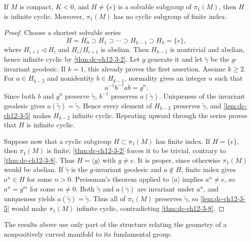 \begin{theorem}
  \label{thm:dc-ch12-3-10}
  If $M$ is compact, $K<0$, and $H\neq\{e\}$ is a solvable subgroup of
  $\pi_1(M)$, then $H$ is infinite cyclic. Moreover, $\pi_1(M)$ has no cyclic
  subgroup of finite index.
\end{theorem}
\begin{proof}
  \sketch
  Choose a shortest solvable series
  \[
    H=H_0\supset H_1\supset\cdots\supset H_{k-1}\supset H_k=\{e\},
  \]
  where $H_{i+1}\triangleleft H_i$ and $H_i/H_{i+1}$ is abelian. Then
  $H_{k-1}$ is nontrivial and abelian, hence infinite cyclic by
  \cref{thm:dc-ch12-3-2}. Let $g$ generate it and let $\tilde\gamma$ be the
  $g$-invariant geodesic. If $k=1$, this already proves the first assertion.
  Assume $k\geq2$. For $a\in H_{k-2}$ and nonidentity
  $b\in H_{k-1}$, normality gives an integer $n$ such that
  \[
    a^{-1}b^{-1}ab=g^n.
  \]
  Since both $b$ and $g^n$ preserve $\tilde\gamma$, $b^{-1}$ preserves
  $a(\tilde\gamma)$. Uniqueness of the invariant geodesic gives
  $a(\tilde\gamma)=\tilde\gamma$. Hence every element of $H_{k-2}$ preserves
  $\tilde\gamma$, and \cref{lem:dc-ch12-3-5} makes $H_{k-2}$ infinite
  cyclic. Repeating upward through the series proves that $H$ is infinite
  cyclic.

  Suppose now that a cyclic subgroup $H\subset\pi_1(M)$ has finite index. If
  $H=\{e\}$, then $\pi_1(M)$ is finite; \cref{thm:dc-ch12-3-2} forces it to
  be trivial, contrary to \cref{thm:dc-ch12-3-8}. Thus
  $H=\langle g\rangle$ with $g\neq e$. It is proper, since otherwise
  $\pi_1(M)$ would be abelian. If $\tilde\gamma$ is the $g$-invariant geodesic
  and $a\notin H$, finite index gives $a^n\in H$ for some $n>0$.
  Preissman's theorem applied to $\langle a\rangle$ implies $a^n\neq e$, so
  $a^n=g^m$ for some $m\neq0$. Both $\tilde\gamma$ and
  $a(\tilde\gamma)$ are invariant under $a^n$, and uniqueness yields
  $a(\tilde\gamma)=\tilde\gamma$. Thus all of $\pi_1(M)$ preserves
  $\tilde\gamma$, so \cref{lem:dc-ch12-3-5} would make $\pi_1(M)$ infinite
  cyclic, contradicting \cref{thm:dc-ch12-3-8}.
\end{proof}

\begin{remark}
  \label{rem:dc-ch12-3-11}
  The results above use only part of the structure relating the geometry of a
  nonpositively curved manifold to its fundamental group.
\end{remark}
